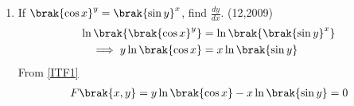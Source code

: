 \begin{enumerate}[label=\thesubsection.\arabic*, ref=\thesubsection.\theenumi]
  \begin{align}
  	\frac{\partial F}{\partial x} &= \frac{\partial}{\partial x}\brak{\sin y - x \sin\brak{a + y}}
  	\\
  	&= -\sin\brak{a + y}
  	\label{eq:EE26BTECH11202-partial_x}
  \end{align}
  From \eqref{eq:cosdif}
  \begin{align}
  	\frac{\partial F}{\partial y} &= \frac{\partial}{\partial y}\brak{\sin y - x \sin\brak{a + y}}
  	\\
  	&= \cos y - x \cos\brak{a + y}  \label{eq:EE26BTECH11202-partial_y}
    \end{align}
    As
    \begin{align}
    	x = \frac{\sin y}{\sin\brak{a + y}}
    	\label{eq:EE26BTECH11202-x_expr}
    \end{align}
     Substituting \eqref{eq:EE26BTECH11202-x_expr} into \eqref{eq:EE26BTECH11202-partial_y}:
     \begin{align}
     	\frac{\partial F}{\partial y} &= \cos y - \brak{\frac{\sin y}{\sin\brak{a + y}}} \cos\brak{a + y}
     	\\
     	&= \frac{\sin\brak{a + y}\cos y - \cos\brak{a + y}\sin y}{\sin\brak{a + y}}
     \end{align}
     From \eqref{sinsub}
     \begin{align}
     	\sin\brak{a + y}\cos y - \cos\brak{a + y}\sin y = \sin\brak{a + y - y} = \sin a
     \end{align}
     \begin{align}
     	\frac{\partial F}{\partial y} = \frac{\sin a}{\sin\brak{a + y}}
     	\label{eq:EE26BTECH11202-partial_y_simplified}
     \end{align}
     Substituting \eqref{eq:EE26BTECH11202-partial_x} and \eqref{eq:EE26BTECH11202-partial_y_simplified} into \eqref{eq:implicit_theorem}:
     \begin{align}
     	\frac{dy}{dx} &= -\frac{-\sin\brak{a + y}}{\frac{\sin a}{\sin\brak{a + y}}}
     	\\
     	&= \frac{\sin^2\brak{a + y}}{\sin a}
     \end{align}
    
  \item If $\brak{\cos x}^y = \brak{\sin y}^x$, find $\frac{dy}{dx}$. \hfill{(12,2009)} \\
  \solution
  \begin{align}
  	\ln\brak{\brak{\cos x}^y} &= \ln\brak{\brak{\sin y}^x}
  	\\
  	\implies y \ln\brak{\cos x} &= x \ln\brak{\sin y}
  \end{align}
  From \eqref{ITF1}
  \begin{align}
  	F\brak{x, y} = y \ln\brak{\cos x} - x \ln\brak{\sin y} = 0
  	\label{functional}
  \end{align}
 

\end{enumerate}
